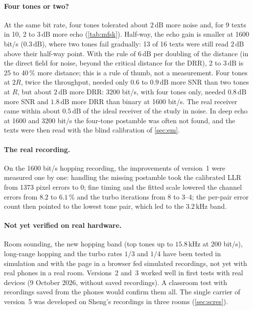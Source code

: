 \documentclass[11pt,a4paper]{article}
\newcommand{\kHz}{\,\mathrm{kHz}}
\newcommand{\dB}{\,\mathrm{dB}}
\theoremstyle{remark}
\begin{document}
\paragraph{Four tones or two?}
At the same bit rate, four tones tolerated about $2\dB$ more noise and, for 9 texts in 10, 2 to $3\dB$ more echo (\cref{tab:mfsk}). Half-way, the echo gain is smaller at 1600 bit/s ($0.3\dB$), where two tones fail gradually: 13 of 16 texts were still read $2\dB$ above their half-way point. With the rule of $6\dB$ per doubling of the distance (in the direct field for noise, beyond the critical distance for the DRR), 2 to $3\dB$ is 25 to 40\,\% more distance; this is a rule of thumb, not a measurement. Four tones at $2R$, twice the throughput, needed only $0.6$ to $0.9\dB$ more SNR than two tones at $R$, but about $2\dB$ more DRR: 3200 bit/s, with four tones only, needed $0.8\dB$ more SNR and $1.8\dB$ more DRR than binary at 1600 bit/s. The real receiver came within about $0.5\dB$ of the ideal receiver of the study in noise. In deep echo at 1600 and 3200 bit/s the four-tone postamble was often not found, and the texts were then read with the blind calibration of \cref{sec:em}.

\paragraph{The real recording.}
On the 1600 bit/s hopping recording, the improvements of version~1 were measured one by one: handling the missing postamble took the calibrated LLR from 1373 pixel errors to 0; fine timing and the fitted scale lowered the channel errors from $8.2$ to $6.1\,\%$ and the turbo iterations from 8 to 3--4; the per-pair error count then pointed to the lowest tone pair, which led to the $3.2\kHz$ band.

\paragraph{Not yet verified on real hardware.}
Room sounding, the new hopping band (top tones up to $15.8\kHz$ at 200 bit/s), long-range hopping and the turbo rates $1/3$ and $1/4$ have been tested in simulation and with the page in a browser fed simulated recordings, not yet with real phones in a real room. Versions~2 and~3 worked well in first tests with real devices (9 October 2026, without saved recordings). A classroom test with recordings saved from the phones would confirm them all. The single carrier of version~5 was developed on Sheng's recordings in three rooms (\cref{sec:scres}).
\end{document}
